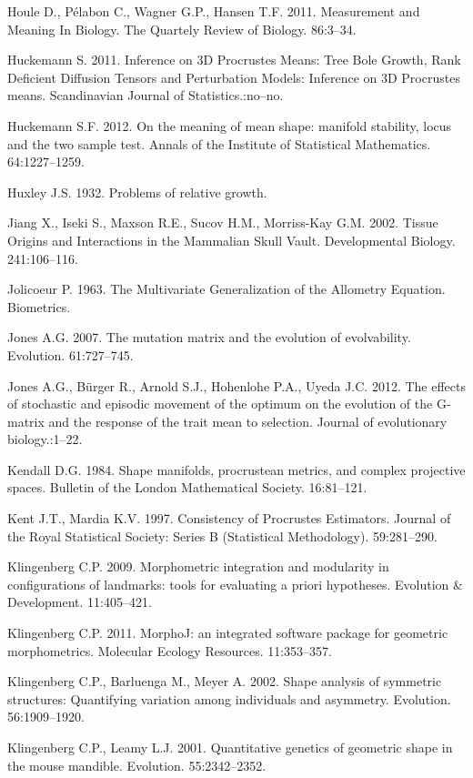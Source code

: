 \documentclass[12pt,]{article}
\begin{document}
Houle D., Pélabon C., Wagner G.P., Hansen T.F. 2011. Measurement and
Meaning In Biology. The Quartely Review of Biology. 86:3--34.

Huckemann S. 2011. Inference on 3D Procrustes Means: Tree Bole Growth,
Rank Deficient Diffusion Tensors and Perturbation Models: Inference on
3D Procrustes means. Scandinavian Journal of Statistics.:no--no.

Huckemann S.F. 2012. On the meaning of mean shape: manifold stability,
locus and the two sample test. Annals of the Institute of Statistical
Mathematics. 64:1227--1259.

Huxley J.S. 1932. Problems of relative growth.

Jiang X., Iseki S., Maxson R.E., Sucov H.M., Morriss-Kay G.M. 2002.
Tissue Origins and Interactions in the Mammalian Skull Vault.
Developmental Biology. 241:106--116.

Jolicoeur P. 1963. The Multivariate Generalization of the Allometry
Equation. Biometrics.

Jones A.G. 2007. The mutation matrix and the evolution of evolvability.
Evolution. 61:727--745.

Jones A.G., Bürger R., Arnold S.J., Hohenlohe P.A., Uyeda J.C. 2012. The
effects of stochastic and episodic movement of the optimum on the
evolution of the G-matrix and the response of the trait mean to
selection. Journal of evolutionary biology.:1--22.

Kendall D.G. 1984. Shape manifolds, procrustean metrics, and complex
projective spaces. Bulletin of the London Mathematical Society.
16:81--121.

Kent J.T., Mardia K.V. 1997. Consistency of Procrustes Estimators.
Journal of the Royal Statistical Society: Series B (Statistical
Methodology). 59:281--290.

Klingenberg C.P. 2009. Morphometric integration and modularity in
configurations of landmarks: tools for evaluating a priori hypotheses.
Evolution \& Development. 11:405--421.

Klingenberg C.P. 2011. MorphoJ: an integrated software package for
geometric morphometrics. Molecular Ecology Resources. 11:353--357.

Klingenberg C.P., Barluenga M., Meyer A. 2002. Shape analysis of
symmetric structures: Quantifying variation among individuals and
asymmetry. Evolution. 56:1909--1920.

Klingenberg C.P., Leamy L.J. 2001. Quantitative genetics of geometric
shape in the mouse mandible. Evolution. 55:2342--2352.
\end{document}
